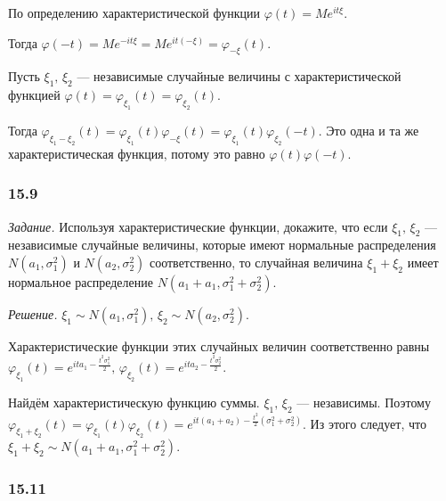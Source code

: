 По определению характеристической функции $ \varphi \left( t \right) = Me^{it \xi }$.

Тогда $ \varphi \left( - t \right) = Me^{- it \xi } = Me^{it \left( - \xi \right) } = \varphi_{- \xi } \left( t \right) $.

Пусть $ \xi_1, \, \xi_2$ ---
независимые случайные величины с характеристической функцией $ \varphi \left( t \right) = \varphi_{ \xi_1} \left( t \right) = \varphi_{ \xi_2} \left( t \right) $.

Тогда
$ \varphi_{ \xi_1 - \xi_2} \left( t \right) =
\varphi_{ \xi_1} \left( t \right) \varphi_{- \xi} \left( t \right) =
\varphi_{ \xi_1} \left( t \right) \varphi_{ \xi_2} \left( - t \right) $.
Это одна и та же характеристическая функция, потому это равно $ \varphi \left( t \right) \varphi \left( - t \right) $.

\subsubsection*{15.9}

\textit{Задание.}
Используя характеристические функции, докажите, что если $ \xi_1, \, \xi_2$ --- независимые случайные величины,
которые имеют нормальные распределения $N \left( a_1, \sigma_1^2 \right) $ и $N \left( a_2, \sigma_2^2 \right) $ соответственно,
то случайная величина $ \xi_1 + \xi_2$ имеет нормальное распределение $N \left( a_1 + a_1, \sigma_1^2 + \sigma_2^2 \right) $.

\textit{Решение.} $ \xi_1 \sim N \left( a_1, \sigma_1^2 \right), \, \xi_2 \sim N \left( a_2, \sigma_2^2 \right) $.

Характеристические функции этих случайных величин соответственно равны
$ \varphi_{ \xi_1} \left( t \right) = e^{ita_1 - \frac{t^2 \sigma_1^2}{2}}, \,
\varphi_{ \xi_2} \left( t \right) = e^{ita_2 - \frac{t^2 \sigma_2^2}{2}}$.

Найдём характеристическую функцию суммы.
$ \xi_1, \, \xi_2$ --- независимы.
Поэтому
$ \varphi_{ \xi_1 + \xi_2} \left( t \right) =
\varphi_{ \xi_1} \left( t \right) \varphi_{ \xi_2} \left( t \right) =
e^{it \left( a_1 + a_2 \right) - \frac{t^2}{2} \left( \sigma_1^2 + \sigma_2^2 \right) }$.
Из этого следует, что $ \xi_1 + \xi_2 \sim N \left( a_1 + a_1, \sigma_1^2 + \sigma_2^2 \right) $.

\subsubsection*{15.11}


